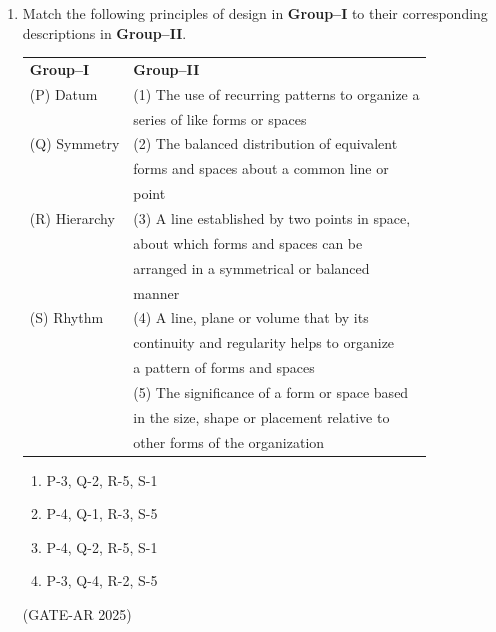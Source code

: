 \documentclass[a4paper,10pt]{article}
\begin{document}
\begin{enumerate}
    \item Match the following principles of design in \textbf{Group–I} to their corresponding descriptions in \textbf{Group–II}. \\
\begin{tabular}{ l l }
\textbf{Group–I} & \textbf{Group–II} \\
(P) Datum & (1) The use of recurring patterns to organize a \\
& series of like forms or spaces \\
(Q) Symmetry & (2) The balanced distribution of equivalent \\
& forms and spaces about a common line or \\
& point \\
(R) Hierarchy & (3) A line established by two points in space, \\
& about which forms and spaces can be \\
& arranged in a symmetrical or balanced \\
& manner \\
(S) Rhythm & (4) A line, plane or volume that by its \\
& continuity and regularity helps to organize \\
& a pattern of forms and spaces \\
& (5) The significance of a form or space based \\
& in the size, shape or placement relative to \\
& other forms of the organization \\
\end{tabular}
\begin{multicols}{2}
\begin{enumerate}
    \item P-3, Q-2, R-5, S-1
    \item P-4, Q-1, R-3, S-5
    \item P-4, Q-2, R-5, S-1
    \item P-3, Q-4, R-2, S-5
\end{enumerate}
\end{multicols}
\hfill (GATE-AR 2025)


\end{enumerate}
\end{document}
